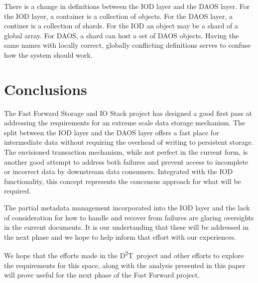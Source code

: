 \documentclass[conference]{sig-alt-gov2}
\newcommand{\DDT}{D\textsuperscript{2}T~}
\begin{document}
There is a change in definitions between the IOD layer and the DAOS layer.
For the IOD layer, a container is a collection of objects. For the DAOS layer,
a continer is a collection of shards. For the IOD an object may be a shard of
a global array. For DAOS, a shard can host a set of DAOS objects. Having the
same names with locally correct, globally conflicting definitions serves to
confuse how the system should work.

\section{Conclusions}
\label{lab:conclusion}

The Fast Forward Storage and IO Stack project has designed a good first pass at
addressing the requirements for an extreme scale data storage mechanism. The
split between the IOD layer and the DAOS layer offers a fast place for
intermediate data without requiring the overhead of writing to persistent
storage. The envisioned transaction mechanism, while not perfect in the current
form, is another good attempt to address both failures and prevent access to
incomplete or incorrect data by downstream data consumers. Integrated with the
IOD functionality, this concept represents the concensus approach for what will
be required.

The partial metadata management incorporated into the IOD layer and the lack of
consideration for how to handle and recover from failures are glaring
oversights in the current documents. It is our undertanding that these will be
addressed in the next phase and we hope to help inform that effort with our
experiences.

We hope that the efforts made in the \DDT project and other efforts to explore
the requirements for this space, along with the analysis presented in this
paper will prove useful for the next phase of the Fast Forward project.
\end{document}
